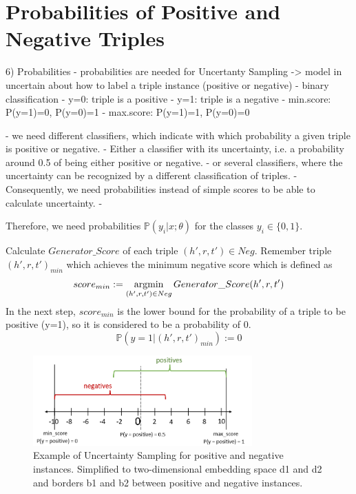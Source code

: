 \section{Probabilities of Positive and Negative Triples} 
\label{sec:probabilities}


6) Probabilities 
- probabilities are needed for Uncertanty Sampling 
-> model in uncertain about how to label a triple instance (positive or negative)
- binary classification
- y=0: triple is a positive
- y=1: triple is a negative
- min.score: P(y=1)=0, P(y=0)=1 
- max.score: P(y=1)=1, P(y=0)=0

- we need different classifiers, which indicate with which probability a given triple is positive or negative.
- Either a classifier with its uncertainty, i.e. a probability around 0.5 of being either positive or negative.
- or several classifiers, where the uncertainty can be recognized by a different classification of triples. 
- Consequently, we need probabilities instead of simple scores to be able to calculate uncertainty.
- 

Therefore, we need probabilities $\mathds{P}(y_i | x; \theta)$ for the classes $y_i \in \{0, 1\}$.

Calculate $Generator\_Score$ of each triple $(h',r,t') \in Neg$.
Remember triple $(h',r,t')_{min}$ which achieves the minimum negative score which is defined as
\begin{equation}
    score_{min} := \operatorname*{argmin}_{(h', r, t') \in Neg}{Generator\_Score(h', r, t')}
\end{equation}
In the next step, $score_{min}$ is the lower bound for the probability of a triple to be positive (y=1), so it is considered to be a probability of 0.
\begin{equation}
    \mathds{P}(y = 1|(h', r, t')_{min}) := 0
\end{equation}

\begin{figure}[t]
  \centering
    \includegraphics[width=0.75\textwidth]{figures/positives_negatives1.PNG}
  \caption{Example of Uncertainty Sampling for positive and negative instances. Simplified to two-dimensional embedding space d1 and d2 and borders b1 and b2 between positive and negative instances.}
  \label{fig:informativeinstances}
\end{figure}

